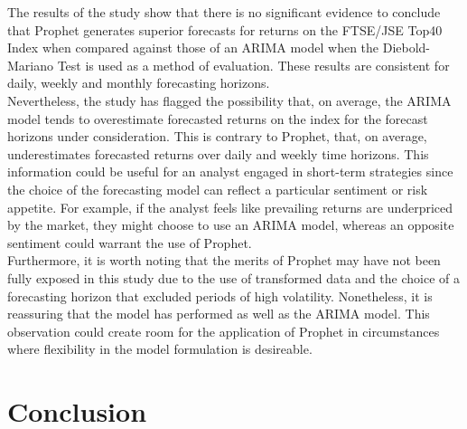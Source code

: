\documentclass[12pt,a4paper]{article}
\numberwithin{equation}{section}
\numberwithin{figure}{section}
\numberwithin{table}{section}
\begin{document}
The results of the study show that there is no significant evidence to
conclude that Prophet generates superior forecasts for returns on the
FTSE/JSE Top40 Index when compared against those of an ARIMA model when
the Diebold-Mariano Test is used as a method of evaluation. These
results are consistent for daily, weekly and monthly forecasting
horizons.\\
Nevertheless, the study has flagged the possibility that, on average,
the ARIMA model tends to overestimate forecasted returns on the index
for the forecast horizons under consideration. This is contrary to
Prophet, that, on average, underestimates forecasted returns over daily
and weekly time horizons. This information could be useful for an
analyst engaged in short-term strategies since the choice of the
forecasting model can reflect a particular sentiment or risk appetite.
For example, if the analyst feels like prevailing returns are
underpriced by the market, they might choose to use an ARIMA model,
whereas an opposite sentiment could warrant the use of Prophet.\\
Furthermore, it is worth noting that the merits of Prophet may have not
been fully exposed in this study due to the use of transformed data and
the choice of a forecasting horizon that excluded periods of high
volatility. Nonetheless, it is reassuring that the model has performed
as well as the ARIMA model. This observation could create room for the
application of Prophet in circumstances where flexibility in the model
formulation is desireable.

\section{Conclusion}\label{conclusion}
\end{document}
